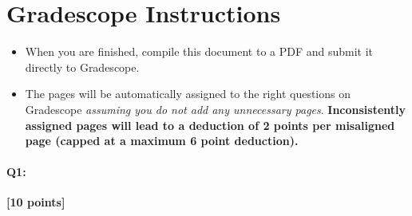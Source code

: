 \section*{ Gradescope Instructions}
\begin{itemize}
  \item When you are finished, compile this document to a PDF and submit it directly to Gradescope. 
  \item The pages will be automatically assigned to the right questions on Gradescope \textit{assuming you do not add any unnecessary pages}. \textbf{Inconsistently assigned pages will lead to a deduction of 2 points per misaligned page (capped at a maximum 6 point deduction).}
\end{itemize}

\pagebreak

\paragraph{Q1:} \textbf{[10 points]}

